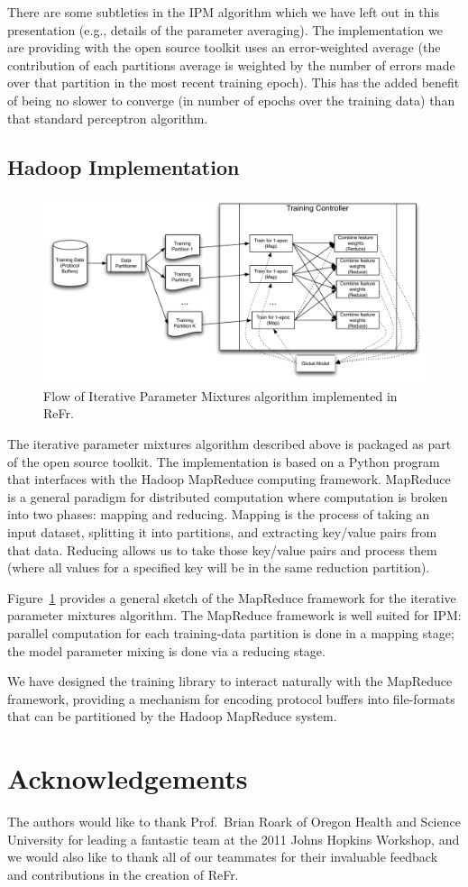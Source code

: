 \documentclass[a4paper]{article}
\begin{document}
There are some subtleties in the IPM algorithm which we have left out
in this presentation (e.g., details of the parameter averaging).
The implementation we are providing with the open source toolkit uses
an error-weighted average (the contribution of each partitions
average is weighted by the number of errors made over that partition in the most
recent training epoch).  This has the added benefit of being no slower to
converge (in number of epochs over the training data) than that standard
perceptron algorithm.

\subsection{Hadoop Implementation}
\begin{figure}[th]
\centering \includegraphics[width=.5\textwidth]{graphics/mapreduceflow} 
\caption{\label{fig:hadoopipm}Flow of Iterative Parameter Mixtures algorithm implemented in {ReFr}.}
\end{figure}

The iterative parameter mixtures algorithm described above is packaged as part
of the open source toolkit.  The implementation is based on a Python program
that interfaces with the Hadoop MapReduce computing framework.
MapReduce is a general paradigm for distributed computation
\cite{dean08mapreduce} where computation is broken into two phases:
mapping and reducing.  Mapping is the process of taking an input dataset,
splitting it into partitions, and extracting key/value pairs from that data.
Reducing allows us to take those key/value pairs and process them (where all
values for a specified key will be in the same reduction partition).

Figure~\ref{fig:hadoopipm} provides a general sketch of the MapReduce framework
for the iterative parameter mixtures algorithm.
The MapReduce framework is well suited for IPM: parallel computation for each
training-data partition is done in a mapping stage; the model parameter mixing
is done via a reducing stage.

We have designed the training library to interact naturally with the
MapReduce framework, providing a mechanism for encoding protocol buffers
into file-formats that can be partitioned by the Hadoop MapReduce
system.

\section{Acknowledgements}
The authors would like to thank Prof.\ Brian Roark of Oregon Health and
Science University for leading a fantastic team at the 2011 Johns
Hopkins Workshop, and we would also like to thank all of our teammates
for their invaluable feedback and contributions in the creation of
ReFr.

\newpage
%
\eightpt


\end{document}

